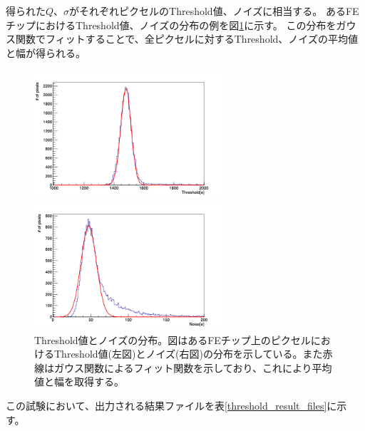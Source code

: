 得られた$Q$、$\sigma$がそれぞれピクセルのThreshold値、ノイズに相当する。
あるFEチップにおけるThreshold値、ノイズの分布の例を図\ref{threshold_mean_sigma}に示す。
この分布をガウス関数でフィットすることで、全ピクセルに対するThreshold、ノイズの平均値と幅が得られる。

\begin{figure}[bpt]\centering
  \begin{minipage}{0.45\hsize}
    \includegraphics[width=7cm]{./data/analysis_result/Threshold_mean_dist.png}
  \end{minipage}
  \begin{minipage}{0.45\hsize}
    \includegraphics[width=7cm]{./data/analysis_result/Threshold_noise_dist.png}
  \end{minipage}
  \caption[Threshold値とノイズの分布]{Threshold値とノイズの分布。図はあるFEチップ上のピクセルにおけるThreshold値(左図)とノイズ(右図)の分布を示している。また赤線はガウス関数によるフィット関数を示しており、これにより平均値と幅を取得する。}
  \label{threshold_mean_sigma}
\end{figure}

この試験において、出力される結果ファイルを表\ref{threshold_result_files}に示す。

